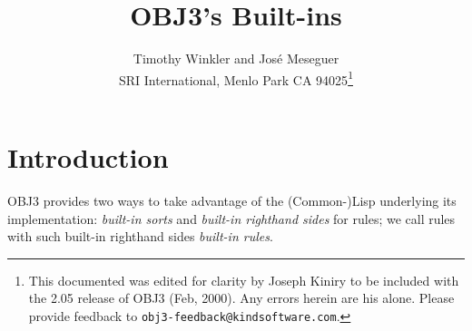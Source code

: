 
\setlength{\headsep}{-.4in}
\setlength{\textwidth}{6.5in}
\setlength{\textheight}{9in}
\setlength{\oddsidemargin}{0in}

\newcommand{\warn}{\noindent {\bf Warning:} \hspace{1ex}}
\newcommand{\bobj}{\begin{quote}\begin{alltt}}
\newcommand{\eobj}{\end{alltt}\end{quote}}
\newcommand{\more}{\vspace{.1in}{\begin{center} ||| MORE TO COME HERE |||
  \end{center}}\vspace{.1in}}

\newcommand{\nt}[1]{\mbox{$\langle\!\!\!$ {\it {#1}} $\!\!\rangle$}}
\newcommand{\alt}{$\mid$}
\newcommand{\lopt}{$[$}
\newcommand{\ropt}{$]$}
\newcommand{\lsg}{\{}
\newcommand{\rsg}{\}}
\newcommand{\itr}{$\ldots$}
\newcommand{\itd}{$\ldots$}

\def\newblock{}


\newcommand{\ra}{$\rightarrow$}
\newcommand{\noi}{\noindent}



\title{\vspace{-.75in}OBJ3's Built-ins}

\author{Timothy Winkler and Jos\'e Meseguer \\
  SRI International, Menlo Park CA 94025\footnote{This documented was
  edited for clarity by Joseph Kiniry to be included with the 2.05
  release of OBJ3 (Feb, 2000).  Any errors herein are his alone.
  Please provide feedback to {\tt obj3-feedback@kindsoftware.com}.}}

\maketitle

\section{Introduction}

OBJ3 provides two ways to take advantage of the (Common-)Lisp underlying
its implementation: {\em built-in sorts} and {\em built-in righthand
sides} for rules; we call rules with such built-in righthand sides
{\em built-in rules}.

